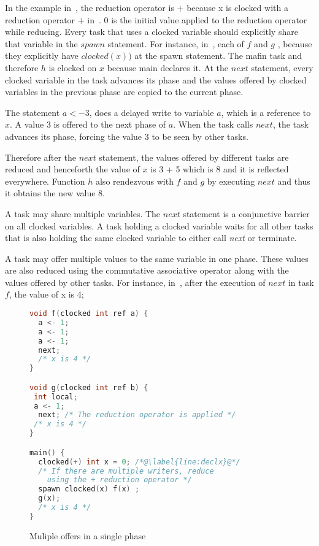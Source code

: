 \documentclass[10pt, conference, compsocconf]{IEEEtran}
\begin{document}
In the example in~, the reduction operator is $+$ because x
is clocked  with a reduction operator $+$ in~.
$0$ is the initial value applied to the reduction operator while reducing.
 Every task that uses a clocked variable should explicitly share that
variable in the $spawn$ statement. 
 For instance, in~, each 
of $f$ and $g$ , because they explicitly have $clocked(x))$ at the
spawn statement. The mafin task and therefore $h$ is clocked on $x$ 
because main declares it.
At the $next$ statement, every clocked variable in the task advances its phase and the values offered
by clocked variables in the previous phase are copied to the current phase. 


The statement $a <- 3$, does a delayed write to variable $a$, 
which is a reference to $x$. A value $3$ is offered to the next phase of $a$.
 When the task calls $next$,
the task advances its phase, forcing the value $3$ to be 
seen by other tasks. 

Therefore after the $next$ statement, the values offered by different
tasks are reduced and henceforth the value of $x$ is 3 + 5 which is 8
and it is reflected everywhere.
Function $h$ also rendezvous with $f$ and $g$  by executing $next$
and thus it obtains the new value 8.

 A task may
share multiple variables.
The $next$ statement is a conjunctive barrier on all clocked variables. 
A task holding a clocked variable waits for all other tasks that is also
holding the same clocked variable to either call \emph{next} or terminate.

A task may offer multiple values to the same variable in one phase. These values are also reduced using the commutative associative operator along with the values offered by other tasks. For instance, in~, after the execution of 
$next$ in task $f$, the value of x is 4;
\begin{figure}
\begin{lstlisting}[language=C]
void f(clocked int ref a) {
  a <- 1;
  a <- 1;
  a <- 1;
  next;
  /* x is 4 */
}

void g(clocked int ref b) {
 int local;
 a <- 1;
  next; /* The reduction operator is applied */
 /* x is 4 */
}

main() {
  clocked(+) int x = 0; /*@\label{line:declx}@*/
  /* If there are multiple writers, reduce
    using the + reduction operator */
  spawn clocked(x) f(x) ;
  g(x);
  /* x is 4 */
}
\end{lstlisting}
\caption{Muliple offers in a single phase}
\label{fig:ddc-multiple}
\end{figure}
\end{document}
